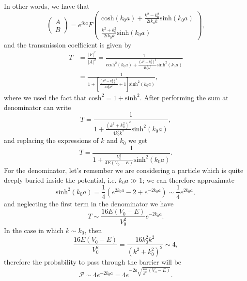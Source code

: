 In other words, we have that
\begin{equation*}
    \left( \begin{array}{c}
    A \\
    B
    \end{array} \right) 
    = e^{ika}F
    \left( \begin{array}{c}
    \mbox{cosh}(k_0a)+\frac{k^2-k_0^2}{2ik_0k}\mbox{sinh}(k_0a)\\
    \frac{k^2+k_0^2}{2ik_0k}\mbox{sinh}(k_0a)
    \end{array} \right),
\end{equation*}
and the transmission coefficient is given by
\begin{equation*}
    \begin{split}
    T & = \frac{|F|^2}{|A|^2} = \frac{1}{\mbox{cosh}^2(k_0a) + \frac{(k^2-k_0^2)^2}{4k_0^2k^2} \mbox{sinh}^2(k_0a)} \\
    & = \frac{1}{1+\left[\frac{(k^2-k_0^2)^2}{4k_0^2k^2}+1\right] \mbox{sinh}^2(k_0a)},
    \end{split}
\end{equation*}
where we used the fact that $\mbox{cosh}^2 = 1+\mbox{sinh}^2$. After performing the sum at denominator can write
\begin{equation*}
    T = \frac{1}{1+\frac{(k^2+k_0^2)^2}{4k_0^2k^2} \mbox{sinh}^2(k_0a)},
\end{equation*}
and replacing the expressions of $k$ and $k_0$ we get
\begin{equation*}
     T = \frac{1}{1+\frac{V_0^2}{4E(V_0-E)} \mbox{sinh}^2(k_0a)}.
\end{equation*}
For the denominator, let's remember we are considering a particle which is quite deeply buried inside the potential, i.e. \(k_0a\gg 1\); we can therefore approximate
\begin{equation*}
    \mbox{sinh}^2(k_0a) = \frac{1}{4}\left(e^{2k_0a}-2+e^{-2k_0a}\right) \sim \frac{1}{4} e^{2k_0a},
\end{equation*}
and neglecting the first term in the denominator we have
\begin{equation*}
    T \sim \frac{16E(V_0-E)}{V_0^2}e^{-2k_0a}.
\end{equation*}
In the case in which $k \sim k_0$, then
\begin{equation*}
    \frac{16E(V_0-E)}{V_0^2} = \frac{16k_0^2k^2}{(k^2+k_0^2)^2} \sim 4,
\end{equation*}
therefore the probability to pass through the barrier will be
\begin{equation*}
    \mathcal{P} \sim 4e^{-2k_0a} = 4e^{-2a\sqrt{\frac{2m}{\hslash^2}(V_0-E)}}.
\end{equation*}


